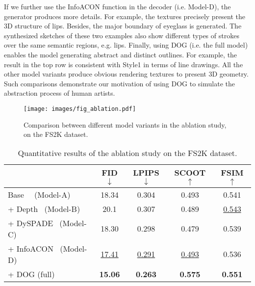 \documentclass[10pt,twocolumn,letterpaper]{article}
\begin{document}
If we further use the InfoACON function in the decoder (i.e. Model-D), the generator produces more details. For example, the textures precisely present the 3D structure of lips. Besides, the major boundary of eyeglass is generated. The synthesized sketches of these two examples also show different types of strokes over the same semantic regions, e.g. lips. %
Finally, using DOG (i.e. the full model) enables the model generating abstract and distinct outlines. For example, the result in the top row is consistent with Style1 in terms of line drawings. All the other model variants produce obvious rendering textures to present 3D geometry. 
Such comparisons demonstrate our motivation of using DOG to simulate the abstraction process of human artists. 


\begin{figure}
	\centering
	\texttt{[image: images/fig\_ablation.pdf]}
	\caption{Comparison between different model variants in the ablation study, on the FS2K dataset.}
	\label{fig:exp_ablation}
\end{figure}

\begin{table}
	\centering
	\tabcolsep=1.5pt
	\caption{Quantitative results of the ablation study on the FS2K dataset.}
	\label{tab:ablation}
		\begin{tabular}{l|cccc}
			\toprule
			&	FID$\downarrow$	&	LPIPS$\downarrow$	&	SCOOT$\uparrow$	&	FSIM$\uparrow$	\\
			\midrule
			Base ~~(Model-A) 	&	18.34	&	0.304	&	0.493	&	0.541	\\
			+ Depth ~(Model-B)	&	20.1	&	0.307	&	0.489	&	\underline{0.543} \\
			+ DySPADE ~(Model-C)	&	18.30	&	0.298	&	0.479	&	0.539	\\
			+ InfoACON ~(Model-D)	&	\underline{17.41}	&	\underline{0.291}	&	\underline{0.493}	&	0.536	\\
			+ DOG (full)	&	\textbf{15.06}	&	\textbf{0.263}	&	\textbf{0.575}	&	\textbf{0.551}	\\
			\bottomrule
		\end{tabular}
\end{table}
\end{document}
